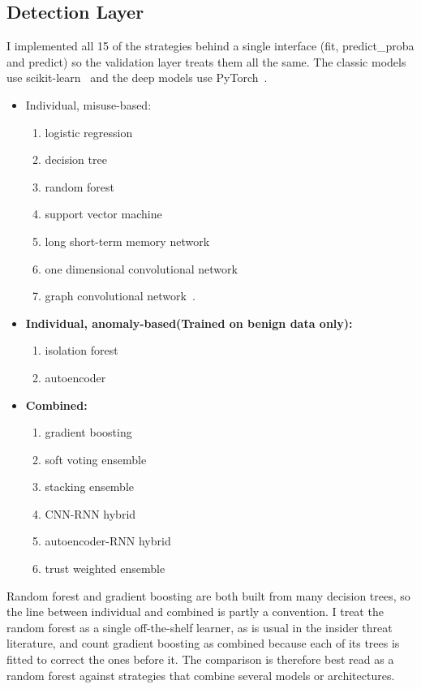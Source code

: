\documentclass[a4paper,12pt]{article}
\begin{document}
\subsection{Detection Layer}
\label{sec:6.5}

I implemented all 15 of the strategies behind a single interface (fit, predict\_proba and predict) so the validation layer treats them all the same. The classic models use scikit-learn~\cite{pedregosa2011} and the deep models use PyTorch~\cite{paszke2019}.

\begin{itemize}
  \item Individual, misuse-based:
  \begin{enumerate}
    \item logistic regression
    \item decision tree
    \item random forest~\cite{breiman2001}
    \item support vector machine~\cite{cortes1995}
    \item long short-term memory network~\cite{hochreiter1997}
    \item one dimensional convolutional network
    \item graph convolutional network~\cite{kipf2017,xiao2023}.
  \end{enumerate}
  \item \textbf{Individual, anomaly-based(Trained on benign data only):}
  \begin{enumerate}
    \item isolation forest~\cite{liu2008}
    \item autoencoder
  \end{enumerate}
\end{itemize}
\begin{itemize}
  \item \textbf{Combined:}
  \begin{enumerate}
    \item gradient boosting
    \item soft voting ensemble
    \item stacking ensemble
    \item CNN-RNN hybrid
    \item autoencoder-RNN hybrid
    \item trust weighted ensemble
  \end{enumerate}
\end{itemize}
Random forest and gradient boosting are both built from many decision trees, so the line between individual and combined is partly a convention. I treat the random forest as a single off-the-shelf learner, as is usual in the insider threat literature, and count gradient boosting as combined because each of its trees is fitted to correct the ones before it. The comparison is therefore best read as a random forest against strategies that combine several models or architectures.
\end{document}
